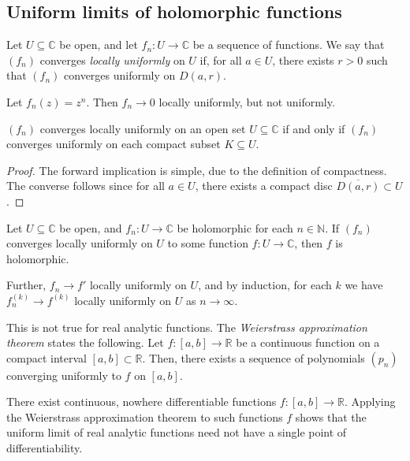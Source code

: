 \subsection{Uniform limits of holomorphic functions}
\begin{definition}
	Let \( U \subseteq \mathbb C \) be open, and let \( f_n \colon U \to \mathbb C \) be a sequence of functions.
	We say that \( (f_n) \) converges \textit{locally uniformly} on \( U \) if, for all \( a \in U \), there exists \( r > 0 \) such that \( (f_n) \) converges uniformly on \( D(a,r) \).
\end{definition}
\begin{example}
	Let \( f_n(z) = z^n \).
	Then \( f_n \to 0 \) locally uniformly, but not uniformly.
\end{example}
\begin{proposition}
	\( (f_n) \) converges locally uniformly on an open set \( U \subseteq \mathbb C \) if and only if \( (f_n) \) converges uniformly on each compact subset \( K \subseteq U \).
\end{proposition}
\begin{proof}
	The forward implication is simple, due to the definition of compactness.
	The converse follows since for all \( a \in U \), there exists a compact disc \( \overline{D(a,r)} \subset U \).
\end{proof}
\begin{theorem}
	Let \( U \subseteq \mathbb C \) be open, and \( f_n \colon U \to \mathbb C \) be holomorphic for each \( n \in \mathbb N \).
	If \( (f_n) \) converges locally uniformly on \( U \) to some function \( f \colon U \to \mathbb C \), then \( f \) is holomorphic.

	Further, \( f_n \to f' \) locally uniformly on \( U \), and by induction, for each \( k \) we have \( f_n^{(k)} \to f^{(k)} \) locally uniformly on \( U \) as \( n \to \infty \).
\end{theorem}
\begin{remark}
	This is not true for real analytic functions.
	The \textit{Weierstrass approximation theorem} states the following.
	Let \( f \colon [a,b] \to \mathbb R \) be a continuous function on a compact interval \( [a,b] \subset \mathbb R \).
	Then, there exists a sequence of polynomials \( (p_n) \) converging uniformly to \( f \) on \( [a,b] \).

	There exist continuous, nowhere differentiable functions \( f \colon [a,b] \to \mathbb R \).
	Applying the Weierstrass approximation theorem to such functions \( f \) shows that the uniform limit of real analytic functions need not have a single point of differentiability.
\end{remark}
